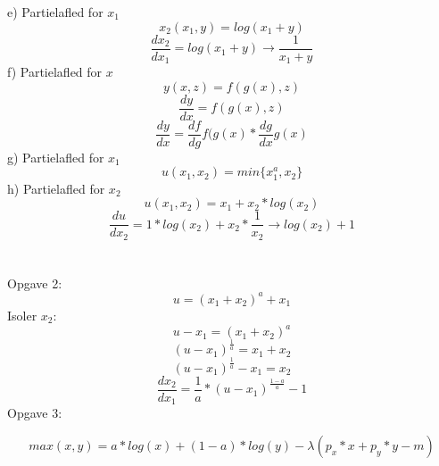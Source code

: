 \documentclass{article}
\begin{document}
e) Partielafled for $x_1$
\begin{equation}
     x_2(x_1,y)=log(x_1+y)
\end{equation}
\begin{equation}
     \frac{dx_2}{dx_1}=log(x_1+y) \longrightarrow \frac{1}{x_1+y}
\end{equation}
f) Partielafled for $x$ 
\begin{equation}
     y(x,z)=f(g(x),z)
\end{equation}
\begin{equation}
     \frac{dy}{dx}=f(g(x),z)
\end{equation}
\begin{equation}
     \frac{dy}{dx}=\frac{df}{dg}f(g(x)*\frac{dg}{dx}g(x)
\end{equation}
g) Partielafled for $x_1$
\begin{equation}
     u(x_1,x_2)=min\{x_1^a,x_2\}
\end{equation}
h) Partielafled for $x_2$
\begin{equation}
     u(x_1,x_2)=x_1+x_2*log(x_2)
\end{equation}
\begin{equation}
     \frac{du}{dx_2}=1*log(x_2)+x_2*\frac{1}{x_2}\longrightarrow log(x_2)+1
\end{equation}
\\ \\
Opgave 2: \\
\begin{equation}
     u=(x_1+x_2)^a+x_1
\end{equation}
Isoler $x_2$:
\begin{equation}
     u-x_1=(x_1+x_2)^a
\end{equation}
\begin{equation}
     (u-x_1)^{\frac{1}{a}}=x_1+x_2
\end{equation}
\begin{equation}
     (u-x_1)^{\frac{1}{a}}-x_1=x_2
\end{equation}
\begin{equation}
     \frac{dx_2}{dx_1}=\frac{1}{a}*(u-x_1)^{\frac{1-a}{a}}-1
\end{equation}
Opgave 3:

\begin{equation}
    max(x,y)=a*log(x)+(1-a)*log(y)-\lambda(p_x*x+p_y*y-m)
\end{equation}
\end{document}
